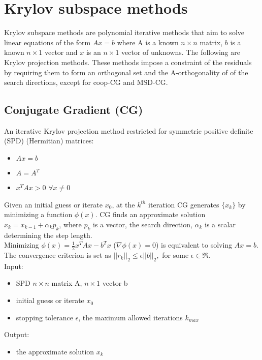 \documentclass[]{scrartcl}
\title{}
\author{Kafa Alameh}
\begin{document}
\maketitle

\begin{abstract}

\end{abstract}

\section{Krylov subspace methods}
Krylov subspace methods are polynomial iterative methods that aim to solve linear equations of the form $Ax=b$ where A is a known $n \times n$ matrix, $b$ is a known $n \times 1$ vector and $x$ is an $n \times 1$ vector of unknowns. The following are Krylov projection methods. These methods impose a constraint of the residuals by requiring them to form an orthogonal set and the A-orthogonality of of the search directions, except for coop-CG and MSD-CG.
\subsection{Conjugate Gradient (CG)}
An iterative Krylov projection method restricted for symmetric positive definite (SPD) (Hermitian) matrices:
\begin{itemize}
	\item $Ax=b$
	\item $A=A^{T}$
	\item $x^{T}Ax>0$ $\forall x \neq 0$
\end{itemize}
Given an initial guess or iterate $x_{0}$, at the $k^{th}$ iteration CG generates $\{x_{k}\}$ by minimizing a function $\phi(x)$. CG finds an approximate solution $x_{k}=x_{k-1}+\alpha_{k}p_{k}$, where $p_{k}$ is a vector, the search direction, $\alpha_{k}$ is a scalar determining the step length. \\ Minimizing $\phi(x)=\frac{1}{2}x^{T}Ax-b^{T}x$ ($\nabla \phi(x)=0$) is equivalent to solving $Ax=b$. \\ The convergence criterion is set as $||r_{k}||_{2} \leq \epsilon||b||_{2},$ for some $\epsilon \in \Re.$ \\
Input: 
\begin{itemize}
	\item SPD $n\times n$ matrix A, $n\times 1$ vector b
	\item initial guess or iterate $x_{0}$
	\item stopping tolerance $\epsilon$, the maximum allowed iterations $k_{max}$ 
\end{itemize}
Output:
\begin{itemize}
	\item the approximate solution $x_{k}$ 
\end{itemize}
\end{document}
